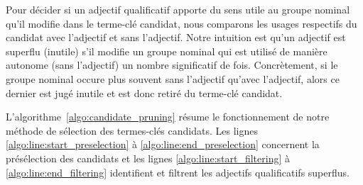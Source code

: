         Pour décider si un adjectif qualificatif apporte du sens utile au groupe
        nominal qu'il modifie dans le terme-clé candidat, nous comparons les
        usages respectifs du candidat avec l'adjectif et sans l'adjectif. Notre
        intuition est qu'un adjectif est superflu (inutile) s'il modifie un
        groupe nominal qui est utilisé de manière autonome (sans l'adjectif) un
        nombre significatif de fois. Concrètement, si le groupe nominal occure
        plus souvent sans l'adjectif qu'avec l'adjectif, alors ce dernier est
        jugé inutile et est donc retiré du terme-clé candidat.

        L'algorithme~\ref{algo:candidate_pruning} résume le fonctionnement de
        notre méthode de sélection des termes-clés candidats. Les lignes
        \ref{algo:line:start_preselection} à \ref{algo:line:end_preselection}
        concernent la présélection des candidats et les lignes
        \ref{algo:line:start_filtering} à \ref{algo:line:end_filtering}
        identifient et filtrent les adjectifs qualificatifs superflus.
